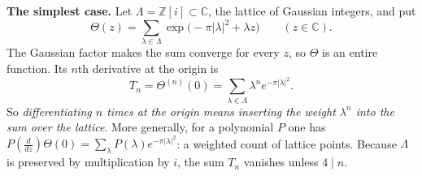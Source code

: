 \documentclass[11pt,letterpaper]{article}
\newcommand{\Z}{\mathbb Z}\newcommand{\Q}{\mathbb Q}\newcommand{\C}{\mathbb C}
\begin{document}
\textbf{The simplest case.} Let $\Lambda=\Z[i]\subset\C$, the lattice of Gaussian integers, and put
\begin{equation}\label{D:12}
 \Theta(z)=\sum_{\lambda\in\Lambda}\exp\big(-\pi|\lambda|^2+\lambda z\big)\qquad(z\in\C).
\end{equation}
The Gaussian factor makes the sum converge for every $z$, so $\Theta$ is an entire function. Its $n$th
derivative at the origin is
\begin{equation}\label{D:13}
 T_n=\Theta^{(n)}(0)=\sum_{\lambda\in\Lambda}\lambda^n e^{-\pi|\lambda|^2}.
\end{equation}
So \emph{differentiating $n$ times at the origin means inserting the weight $\lambda^n$ into the sum over the
lattice}. More generally, for a polynomial $P$ one has
$P(\tfrac{d}{dz})\Theta(0)=\sum_\lambda P(\lambda)e^{-\pi|\lambda|^2}$: a weighted count of lattice points.
Because $\Lambda$ is preserved by multiplication by $i$, the sum $T_n$ vanishes unless $4\mid n$.
\end{document}
